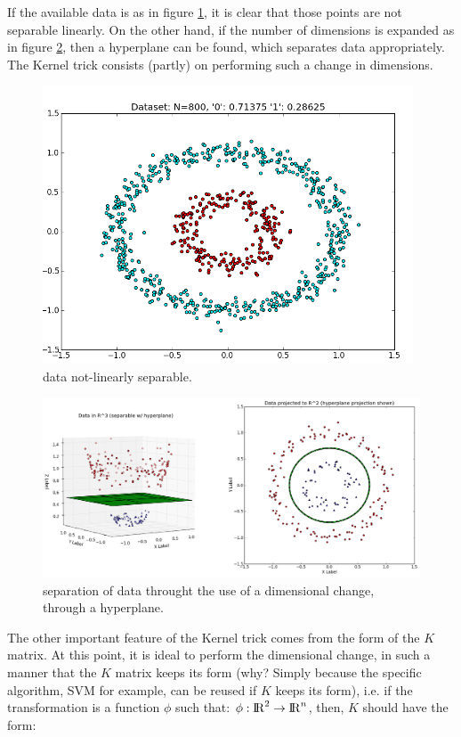 \documentclass[paper=a4, fontsize=11pt]{scrartcl} %
\numberwithin{equation}{section} %
\numberwithin{figure}{section} %
\numberwithin{table}{section} %
\begin{document}
If the available data is as in figure \ref{fig:MKL_example1}, it is clear that those points are not separable linearly. On the other hand, if the number of dimensions is expanded as in figure \ref{fig:MKL_example2}, then a hyperplane can be found, which separates data appropriately. The Kernel trick consists (partly) on performing such a change in dimensions.

\begin{figure}[t]
\includegraphics[width=11cm]{dataset_nonsep}
\centering
\caption{data not-linearly separable.}
\label{fig:MKL_example1}
\end{figure}

\begin{figure}[t]
\includegraphics[width=15cm]{data_2d_to_3d_hyperplane}
\centering
\caption{separation of data throught the use of a dimensional change, through a hyperplane.}
\label{fig:MKL_example2}
\end{figure}

The other important feature of the Kernel trick comes from the form of the $K$ matrix. At this point, it is ideal to perform the dimensional change, in such a manner that the $K$ matrix keeps its form (why? Simply because the specific algorithm, SVM for example, can be reused if $K$ keeps its form), i.e. if the transformation is a function $\phi$ such that: $\phi: {\rm I\!R}^{2}\rightarrow {\rm I\!R}^{n}$, then, $K$ should have the form:
\end{document}
